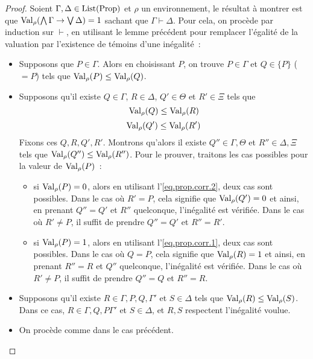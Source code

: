 \begin{proof}
  Soient $\Gamma,\Delta\in\operatorname{List}(\operatorname{Prop})$ et $\rho$ un environnement, le résultat
  à montrer est que $\operatorname{Val}_\rho(\bigwedge\Gamma\to\bigvee\Delta) = 1$ sachant que
  $\Gamma\vdash \Delta$. Pour cela, on procède par induction sur $\vdash$, en
  utilisant le lemme précédent pour remplacer l'égalité de la valuation par
  l'existence de témoins d'une inégalité~:
  \begin{itemize}
  \item Supposons que $P\in\Gamma$. Alors en choisissant $P$, on trouve
    $P\in\Gamma$ et $Q\in\{P\}$ ($=P$) tels que $\operatorname{Val}_\rho(P) \leq\operatorname{Val}_\rho(Q)$.
  \item Supposons qu'il existe $Q\in\Gamma$, $R\in\Delta$, $Q'\in\Theta$ et
    $R'\in\Xi$ tels que
    \begin{equation}\label{eq.prop.corr.1}
      \operatorname{Val}_\rho(Q)\leq\operatorname{Val}_\rho(R)
    \end{equation}
    \begin{equation}\label{eq.prop.corr.2}
      \operatorname{Val}_\rho(Q')\leq\operatorname{Val}_\rho(R')
    \end{equation}
    Fixons ces $Q,R,Q',R'$. Montrons qu'alors il existe $Q''\in\Gamma,\Theta$ et
    $R''\in\Delta,\Xi$ tels que $\operatorname{Val}_\rho(Q'')\leq\operatorname{Val}_\rho(R'')$. Pour le
    prouver, traitons les cas possibles pour la valeur de $\operatorname{Val}_\rho(P)$~:
    \begin{itemize}
    \item si $\operatorname{Val}_\rho(P) = 0$, alors en utilisant l'\cref{eq.prop.corr.2},
      deux cas sont possibles. Dans le cas où $R' = P$, cela signifie que
      $\operatorname{Val}_\rho(Q') = 0$ et ainsi, en prenant $Q'' = Q'$ et $R''$ quelconque,
      l'inégalité est vérifiée. Dans le cas où $R' \neq P$, il suffit de prendre
      $Q'' = Q'$ et $R'' = R'$.
    \item si $\operatorname{Val}_\rho(P) = 1$, alors en utilisant l'\cref{eq.prop.corr.1},
      deux cas sont possibles. Dans le cas où $Q = P$, cela signifie que
      $\operatorname{Val}_\rho(R) = 1$ et ainsi, en prenant $R'' = R$ et $Q''$ quelconque,
      l'inégalité est vérifiée. Dans le cas où $R'\neq P$, il suffit de prendre
      $Q'' = Q$ et $R'' = R$.
    \end{itemize}
  \item Supposons qu'il existe $R\in\Gamma,P,Q,\Gamma'$ et $S\in\Delta$ tels que
    $\operatorname{Val}_\rho(R) \leq \operatorname{Val}_\rho(S)$. Dans ce cas, $R\in\Gamma,Q,P\Gamma'$ et
    $S\in\Delta$, et $R,S$ respectent l'inégalité voulue.
  \item On procède comme dans le cas précédent.

\end{itemize}
\end{proof}
